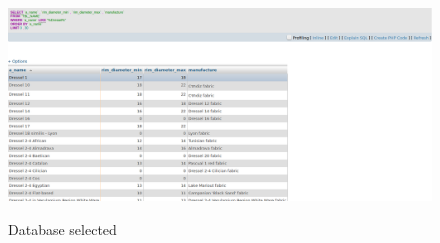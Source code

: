 \documentclass[10pt,a4paper]{article}
\begin{document}
\begin{figure}[hdp]
\centering
\includegraphics[scale=0.30]{query5.png}
\label{query5}
\caption{Database selected}
\end{figure} 

























 
\end{document}
